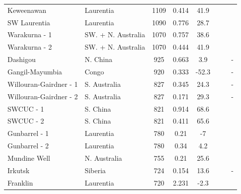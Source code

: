 \begin{table}
{\begin{tabular}{l l c c c l l l}
    Keweenawan & Laurentia & 1109 & 0.414 & 41.9 & \citet{Davis1997a} & \citet{Ernst2017a} & \citet{Swanson-Hysell2014b} \\ \vspace{0.2 cm}
    SW Laurentia & Laurentia & 1090 & 0.776 & 28.7 & \citet{Weil2003a} & \citet{Bright2014a} & \citet{Weil2003a} \\ \vspace{0.2 cm}
    Warakurna - 1 & SW. + N. Australia & 1070 & 0.757 & 38.6 & \citet{Wingate2002a} & \citet{Ernst2017a} & \citet{Wingate2002a} \\ \vspace{0.2 cm}
    Warakurna - 2 & SW. + N. Australia & 1070 & 0.444 & 41.9 & \citet{Wingate2002a} & \citet{Ernst2017a} & \citet{Wingate2002a} \\ \vspace{0.2 cm}
    Dashigou & N. China & 925 & 0.663 & 3.9 & \citet{Peng2011a} & \citet{Pirajno2013a} & - \\ \vspace{0.2 cm}
    Gangil-Mayumbia & Congo & 920 & 0.333 & -52.3 & \citet{Tack2001a} & \citet{Ernst2017a} & - \\ \vspace{0.2 cm}
    Willouran-Gairdner - 1 & S. Australia & 827 & 0.345 & 24.3 & \citet{Wingate1998a} & \citet{Ernst2017a} & - \\ \vspace{0.2 cm}
    Willouran-Gairdner - 2 & S. Australia & 827 & 0.171 & 29.3 & \citet{Wingate1998a} & \citet{Ernst2017a} & - \\ \vspace{0.2 cm}
    SWCUC - 1 & S. China & 821 & 0.914 & 68.6 & \citet{Wang2016b} & \citet{Ernst2017a} & \citet{Li2004a} \\ \vspace{0.2 cm}
    SWCUC - 2 & S. China & 821 & 0.411 & 65.6 & \citet{Wang2016b} & \citet{Ernst2017a} & \citet{Li2004a} \\ \vspace{0.2 cm}
    Gunbarrel - 1 & Laurentia & 780 & 0.21 & -7 & \citet{Harlan2003a} & \citet{Ernst2017a} & \citet{Park1989a} \\ \vspace{0.2 cm}
    Gunbarrel - 2 & Laurentia & 780 & 0.34 & 4.2 & \citet{Harlan2003a} & \citet{Ernst2017a} & \citet{Park1989a} \\ \vspace{0.2 cm}
    Mundine Well & N. Australia & 755 & 0.21 & 25.6 & \citet{Wingate2000a} & \citet{Ernst2017a} & \citet{Wingate2000a} \\ \vspace{0.2 cm}
    Irkutsk & Siberia & 724 & 0.154 & 13.6 & \citet{Ernst2016a} & \citet{Ernst2016a} & - \\ \vspace{0.2 cm}
    Franklin & Laurentia & 720 & 2.231 & -2.3 & \citet{Denyszyn2009a} & \citet{Ernst2017a} & \citet{Denyszyn2009a} \\
    \hline
	\end{tabular}}
	

\end{table}
